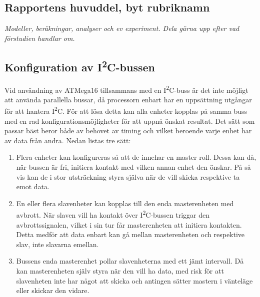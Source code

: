 \documentclass[11pt]{article}
\begin{document}
\begin{flushleft}
\pagebreak

\section{Rapportens huvuddel, byt rubriknamn}
\textit{Modeller, beräkningar, analyser och ev experiment. Dela gärna upp efter vad förstudien handlar om.}

\subsection{Konfiguration av I\textsuperscript{2}C-bussen}

Vid användning av ATMega16 tillsammans med en I\textsuperscript{2}C-buss är det inte möjligt att använda parallella bussar, då processorn enbart har en uppsättning utgångar för att hantera I\textsuperscript{2}C. För att lösa detta kan alla enheter kopplas på samma buss med en rad konfigurationsmöjligheter för att uppnå önskat resultat. Det sätt som passar bäst beror både av behovet av timing och vilket beroende varje enhet har av data från andra. Nedan listas tre sätt:

\begin{enumerate}
 \item Flera enheter kan konfigureras så att de innehar en master roll. Dessa kan då, när bussen är fri, initiera kontakt med vilken annan enhet den önskar. På så vis kan de i stor utsträckning styra själva när de vill skicka respektive ta emot data.
 
 \item En eller flera slavenheter kan kopplas till den enda masterenheten med avbrott. När slaven vill ha kontakt över I\textsuperscript{2}C-bussen triggar den avbrottssignalen, vilket i sin tur får masterenheten att initiera kontakten. Detta medför att data enbart kan gå mellan masterenheten och respektive slav, inte slavarna emellan.
 
 \item Bussens enda masterenhet pollar slavenheterna med ett jämt intervall. Då kan masterenheten själv styra när den vill ha data, med risk för att slavenheten inte har något att skicka och antingen sätter mastern i vänteläge eller skickar den vidare.
\end{enumerate}



\end{flushleft}
\end{document}
